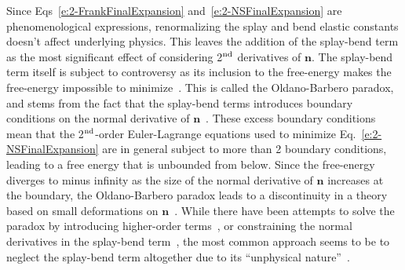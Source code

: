 Since Eqs~\ref{e:2-FrankFinalExpansion} and~\ref{e:2-NSFinalExpansion} are phenomenological expressions, renormalizing the splay and bend elastic constants doesn't affect underlying physics.
This leaves the addition of the splay-bend term as the most significant effect of considering 2$^\textup{nd}$ derivatives of $\mathbf{n}$.
The splay-bend term itself is subject to controversy as its inclusion to the free-energy makes the free-energy impossible to minimize~.
This is called the Oldano-Barbero paradox, and stems from the fact that the splay-bend terms introduces boundary conditions on the normal derivative of $\mathbf{n}$~.
These excess boundary conditions mean that the 2$^\textup{nd}$-order Euler-Lagrange equations used to minimize Eq.~\ref{e:2-NSFinalExpansion} are in general subject to more than 2 boundary conditions, leading to a free energy that is unbounded from below.
Since the free-energy diverges to minus infinity as the size of the normal derivative of $\mathbf{n}$ increases at the boundary, the Oldano-Barbero paradox leads to a discontinuity in a theory based on small deformations on $\mathbf{n}$~.
While there have been attempts to solve the paradox by introducing higher-order terms~, or constraining the normal derivatives in the splay-bend term~, the most common approach seems to be to neglect the splay-bend term altogether due to its ``unphysical nature''~.

